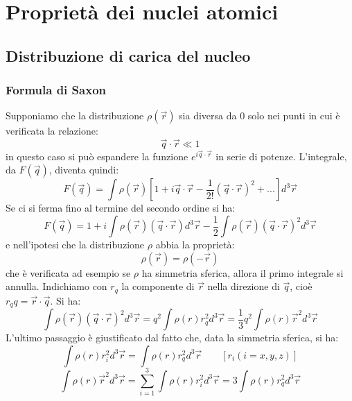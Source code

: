 \chapter{Proprietà dei nuclei atomici}
\section{Distribuzione di carica del nucleo}
\subsection{Formula di Saxon}
Supponiamo  che la distribuzione $\rho{(\vec{r})}$ sia diversa da 0 solo nei punti in cui è verificata la relazione:
\begin{equation}
\vec{q} \cdot \vec{r} \ll 1
\end{equation}
in questo caso si può espandere la funzione $e^{i\vec{q} \cdot \vec{r}}$ in
serie di potenze. L'integrale, da $F{(\vec{q})}$, diventa quindi:
\begin{equation}
F{(\vec{q})} = \int \rho{(\vec{r})} \left[ 1 + i\vec{q} \cdot \vec{r} - \frac{1}{2!}(\vec{q} \cdot \vec{r})^2 + ... \right] d^3\vec{r}
\end{equation}
Se ci si ferma fino al termine del secondo ordine si ha:
\begin{equation}
F{(\vec{q})} = 1 + i\int \rho{(\vec{r})}(\vec{q} \cdot \vec{r}) d^3\vec{r} - \frac{1}{2} \int \rho{(\vec{r})}(\vec{q} \cdot \vec{r})^2 d^3\vec{r}
\end{equation}
e nell'ipotesi che la distribuzione $\rho$ abbia la proprietà:
\begin{equation}
\rho{(\vec{r})} = \rho{(-\vec{r})}
\end{equation}
che è verificata ad esempio se $\rho$ ha simmetria sferica, allora il primo
integrale si annulla. Indichiamo con $r_q$ la componente di $\vec{r}$ nella
direzione di $\vec{q}$, cioè $r_q q = \vec{r} \cdot \vec{q}$. Si ha:
\begin{equation}
\int \rho{(\vec{r})}(\vec{q} \cdot \vec{r})^2 d^3\vec{r} = q^2 \int \rho{(r)} r_q^2  d^3\vec{r} = \frac{1}{3} q^2 \int \rho{(r)} \vec{r}^2 d^3\vec{r}
\end{equation}
L'ultimo passaggio è giustificato dal fatto che, data la simmetria sferica, si
ha:
\begin{equation}
\int \rho{(r)} r_i^2 d^3\vec{r} = \int \rho{(r)} r_q^2 d^3\vec{r} \qquad [r_i (i = x,y,z)]
\end{equation}
\begin{equation}
\int \rho{(r)} \vec{r}^2 d^3\vec{r} = \sum_{i=1}^3 \int \rho{(r)} r_i^2 d^3\vec{r} = 3 \int \rho{(r)} r_q^2 d^3\vec{r}
\end{equation}
